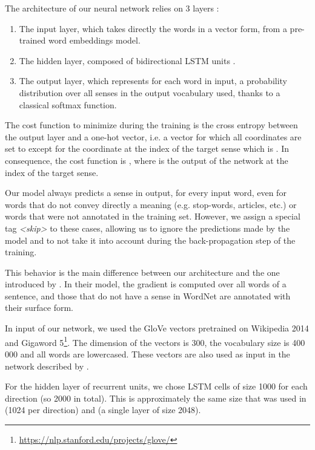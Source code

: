 \documentclass[11pt,a4paper]{article}
\begin{document}
The architecture of our neural network relies on 3 layers :

\begin{enumerate}
    \item The input layer, which takes directly the words in a vector form, from a pre-trained word embeddings model. \item The hidden layer, composed of bidirectional LSTM units \citep{LSTM1997}. \item The output layer, which represents for each word in input, a probability distribution over all senses in the output vocabulary used, thanks to a classical softmax function.
\end{enumerate}

The cost function to minimize during the training is the cross entropy between the output layer and a one-hot vector, i.e. a vector for which all coordinates are set to  except for the coordinate at the index of the target sense which is . In consequence, the cost function is , where  is the output of the network at the index  of the target sense.



Our model always predicts a sense in output, for every input word, even for words that do not convey directly a meaning (e.g. stop-words, articles, etc.) or words that were not annotated in the training set. However, we assign a special tag \textit{<skip>} to these cases, allowing us to ignore the predictions made by the model and to not take it into account during the back-propagation step of the training. 

This behavior is the main difference between our architecture and the one introduced by \cite{raganato2017}. In their model, the gradient is computed over all words of a sentence, and those that do not have a sense in WordNet are annotated with their surface form.




In input of our network, we used the GloVe vectors \citep{pennington2014glove} pretrained on Wikipedia 2014 and Gigaword 5\footnote{\url{https://nlp.stanford.edu/projects/glove/}}. The dimension of the vectors is 300, the vocabulary size is 400\,000 and all words are lowercased. These vectors are also used as input in the network described by \cite{kaageback2016word}. 

For the hidden layer of recurrent units, we chose LSTM cells of size 1000 for each direction (so 2000 in total). This is approximately the same size that was used in \cite{raganato2017} (1024 per direction) and \cite{yuan_2016} (a single layer of size 2048).
\end{document}
